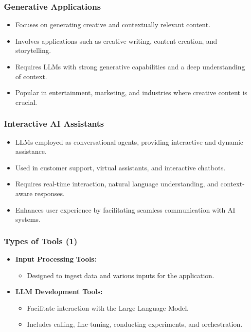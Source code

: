 \begin{frame}[fragile]\frametitle{Generative Applications}

      \begin{itemize}
        \item Focuses on generating creative and contextually relevant content.
        \item Involves applications such as creative writing, content creation, and storytelling.
        \item Requires LLMs with strong generative capabilities and a deep understanding of context.
        \item Popular in entertainment, marketing, and industries where creative content is crucial.
      \end{itemize}
\end{frame}

\begin{frame}[fragile]\frametitle{Interactive AI Assistants}
      \begin{itemize}
        \item LLMs employed as conversational agents, providing interactive and dynamic assistance.
        \item Used in customer support, virtual assistants, and interactive chatbots.
        \item Requires real-time interaction, natural language understanding, and context-aware responses.
        \item Enhances user experience by facilitating seamless communication with AI systems.
      \end{itemize}
\end{frame}

\begin{frame}[fragile]\frametitle{Types of Tools (1)}
  \begin{itemize}
    \item \textbf{Input Processing Tools:}
      \begin{itemize}
        \item Designed to ingest data and various inputs for the application.
      \end{itemize}
    \item \textbf{LLM Development Tools:}
      \begin{itemize}
        \item Facilitate interaction with the Large Language Model.
        \item Includes calling, fine-tuning, conducting experiments, and orchestration.
      \end{itemize}
  \end{itemize}
\end{frame}

